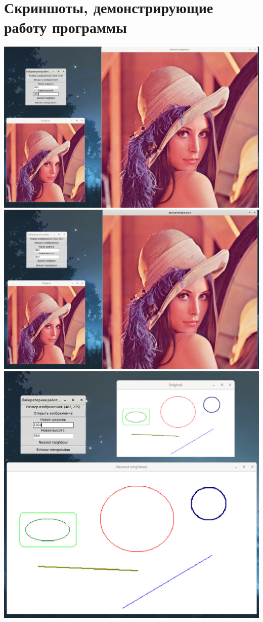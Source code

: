 \documentclass[a4paper,12pt]{article}
\begin{document}
\section{\normalsize{Скриншоты, демонстрирующие работу программы}}
\begin{flushleft}
  \includegraphics[scale=1]{nearest_1.jpg}
  \includegraphics[scale=1]{bilinear_1.jpg}
  \includegraphics[scale=1.5]{nearest_2.jpg}

\end{flushleft}
\end{document}
